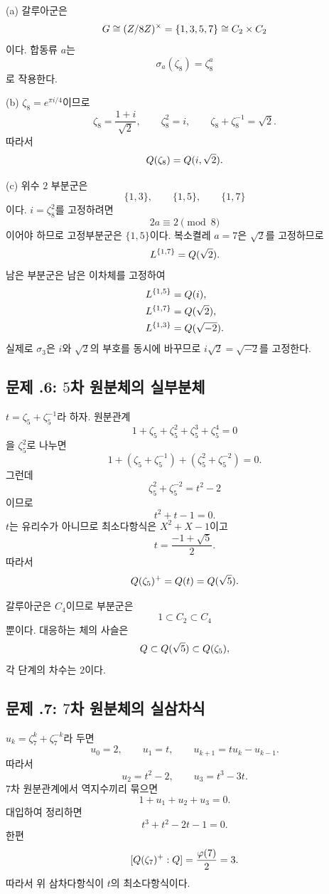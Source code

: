 \begin{solution}
(a) 갈루아군은
\[
  G\cong(Z/8Z)^\times
  =\{1,3,5,7\}
  \cong C_2\times C_2
\]
이다. 합동류 $a$는
\[
  \sigma_a(\zeta_8)=\zeta_8^a
\]
로 작용한다.

(b) $\zeta_8=e^{\pi i/4}$이므로
\[
  \zeta_8=\frac{1+i}{\sqrt2},
  \qquad
  \zeta_8^2=i,
  \qquad
  \zeta_8+\zeta_8^{-1}=\sqrt2.
\]
따라서
\[
  Q(\zeta_8)=Q(i,\sqrt2).
\]

(c) 위수 $2$ 부분군은
\[
  \{1,3\},\qquad\{1,5\},\qquad\{1,7\}
\]
이다. $i=\zeta_8^2$를 고정하려면
\[
  2a\equiv2\pmod8
\]
이어야 하므로 고정부분군은 $\{1,5\}$이다. 복소켤레 $a=7$은 $\sqrt2$를 고정하므로
\[
  L^{\{1,7\}}=Q(\sqrt2).
\]
남은 부분군은 남은 이차체를 고정하여
\[
\begin{aligned}
  L^{\{1,5\}}&=Q(i),\\
  L^{\{1,7\}}&=Q(\sqrt2),\\
  L^{\{1,3\}}&=Q(\sqrt{-2}).
\end{aligned}
\]
실제로 $\sigma_3$은 $i$와 $\sqrt2$의 부호를 동시에 바꾸므로 $i\sqrt2=\sqrt{-2}$를 고정한다.
\end{solution}

\subsection*{문제 \thechapter.6: $5$차 원분체의 실부분체}

\begin{solution}
$t=\zeta_5+\zeta_5^{-1}$라 하자. 원분관계
\[
  1+\zeta_5+\zeta_5^2+\zeta_5^3+\zeta_5^4=0
\]
을 $\zeta_5^2$로 나누면
\[
  1+(\zeta_5+\zeta_5^{-1})
  +(\zeta_5^2+\zeta_5^{-2})=0.
\]
그런데
\[
  \zeta_5^2+\zeta_5^{-2}=t^2-2
\]
이므로
\[
  t^2+t-1=0.
\]
$t$는 유리수가 아니므로 최소다항식은 $X^2+X-1$이고
\[
  t=\frac{-1+\sqrt5}{2}.
\]
따라서
\[
  Q(\zeta_5)^+=Q(t)=Q(\sqrt5).
\]

갈루아군은 $C_4$이므로 부분군은
\[
  1\subset C_2\subset C_4
\]
뿐이다. 대응하는 체의 사슬은
\[
  Q
  \subset Q(\sqrt5)
  \subset Q(\zeta_5),
\]
각 단계의 차수는 $2$이다.
\end{solution}

\subsection*{문제 \thechapter.7: $7$차 원분체의 실삼차식}

\begin{solution}
$u_k=\zeta_7^k+\zeta_7^{-k}$라 두면
\[
  u_0=2,\qquad u_1=t,
  \qquad u_{k+1}=tu_k-u_{k-1}.
\]
따라서
\[
  u_2=t^2-2,
  \qquad
  u_3=t^3-3t.
\]
$7$차 원분관계에서 역지수끼리 묶으면
\[
  1+u_1+u_2+u_3=0.
\]
대입하여 정리하면
\[
  t^3+t^2-2t-1=0.
\]
한편
\[
  [Q(\zeta_7)^+:Q]
  =\frac{\varphi(7)}2=3.
\]
따라서 위 삼차다항식이 $t$의 최소다항식이다.
\end{solution}

